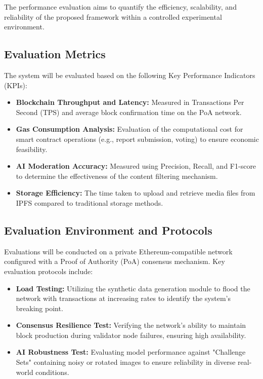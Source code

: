 The performance evaluation aims to quantify the efficiency, scalability, and reliability of the proposed framework within a controlled experimental environment.

\subsection{Evaluation Metrics}
The system will be evaluated based on the following Key Performance Indicators (KPIs):

\begin{itemize}
    \item \textbf{Blockchain Throughput and Latency:} Measured in Transactions Per Second (TPS) and average block confirmation time on the PoA network.
    \item \textbf{Gas Consumption Analysis:} Evaluation of the computational cost for smart contract operations (e.g., report submission, voting) to ensure economic feasibility.
    \item \textbf{AI Moderation Accuracy:} Measured using Precision, Recall, and F1-score to determine the effectiveness of the content filtering mechanism.
    \item \textbf{Storage Efficiency:} The time taken to upload and retrieve media files from IPFS compared to traditional storage methods.
\end{itemize}

\subsection{Evaluation Environment and Protocols}
Evaluations will be conducted on a private Ethereum-compatible network configured with a Proof of Authority (PoA) consensus mechanism. Key evaluation protocols include:

\begin{itemize}
    \item \textbf{Load Testing:} Utilizing the synthetic data generation module to flood the network with transactions at increasing rates to identify the system's breaking point.
    \item \textbf{Consensus Resilience Test:} Verifying the network's ability to maintain block production during validator node failures, ensuring high availability.
    \item \textbf{AI Robustness Test:} Evaluating model performance against "Challenge Sets" containing noisy or rotated images to ensure reliability in diverse real-world conditions.
\end{itemize}
